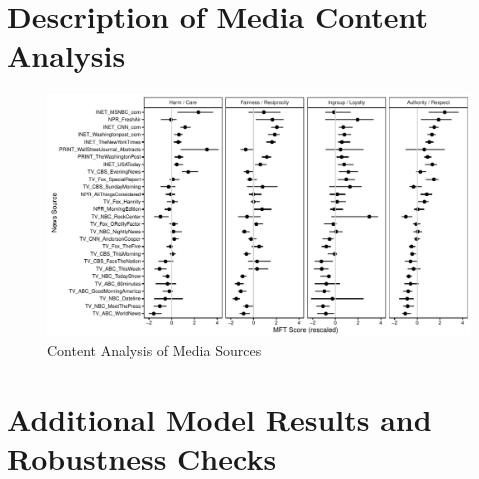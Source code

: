 \documentclass[12pt]{article}
\begin{document}

\clearpage
\section{Description of Media Content Analysis}\label{app:media}
\renewcommand\thefigure{\thesection.\arabic{figure}}
\renewcommand\thetable{\thesection.\arabic{table}}
\setcounter{figure}{0}
\setcounter{table}{0}



\begin{figure}[ht]\centering
\includegraphics[width=\textwidth]{../calc/fig/media_desc.pdf}
\caption{Content Analysis of Media Sources
}\label{fig:media_desc}
\end{figure}

\clearpage
\section{Additional Model Results and Robustness Checks}\label{app:robust}
\renewcommand\thefigure{\thesection.\arabic{figure}}
\renewcommand\thetable{\thesection.\arabic{table}}
\setcounter{figure}{0}
\setcounter{table}{0}
\end{document}
